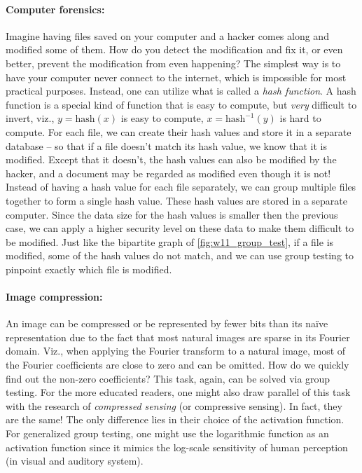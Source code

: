 \paragraph{Computer forensics:} Imagine having files saved on your computer and a hacker comes along and modified some of them. How do you detect the modification and fix it, or even better, prevent the modification from even happening? The simplest way is to have your computer never connect to the internet, which is impossible for most practical purposes. Instead, one can utilize what is called a \textit{hash function}. A hash function is a special kind of function that is easy to compute, but \textit{very} difficult to invert, viz., $y=\mathrm{hash}(x)$ is easy to compute, $x=\mathrm{hash}^{-1}(y)$ is hard to compute. For each file, we can create their hash values and store it in a separate database -- so that if a file doesn't match its hash value, we know that it is modified. Except that it doesn't, the hash values can also be modified by the hacker, and a document may be regarded as modified even though it is not! Instead of having a hash value for each file separately, we can group multiple files together to form a single hash value. These hash values are stored in a separate computer. Since the data size for the hash values is smaller then the previous case, we can apply a higher security level on these data to make them difficult to be modified. Just like the bipartite graph of \autoref{fig:w11_group_test}, if a file is modified, some of the hash values do not match, and we can use group testing to pinpoint exactly which file is modified.

\paragraph{Image compression:} An image can be compressed or be represented by fewer bits than its na\"ive representation due to the fact that most natural images are sparse in its Fourier domain. Viz., when applying the Fourier transform to a natural image, most of the Fourier coefficients are close to zero and can be omitted. How do we quickly find out the non-zero coefficients? This task, again, can be solved via group testing. For the more educated readers, one might also draw parallel of this task with the research of \textit{compressed sensing} (or compressive sensing). In fact, they are the same! The only difference lies in their choice of the activation function. For generalized group testing, one might use the logarithmic function as an activation function since it mimics the log-scale sensitivity of human perception (in visual and auditory system).

